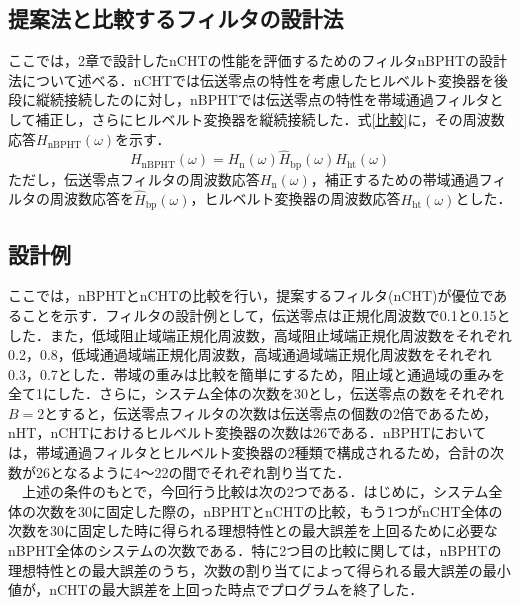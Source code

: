 \documentclass[technicalreport]{ieicej}
\begin{document}
\subsection{提案法と比較するフィルタの設計法}
ここでは，2章で設計したnCHTの性能を評価するためのフィルタnBPHTの設計法について述べる．nCHTでは伝送零点の特性を考慮したヒルベルト変換器を後段に縦続接続したのに対し，nBPHTでは伝送零点の特性を帯域通過フィルタとして補正し，さらにヒルベルト変換器を縦続接続した．式\eqref{比較}に，その周波数応答$H_{\mathrm{nBPHT}}(\omega)$を示す．\begin{equation}\label{比較}
H_{\mathrm{nBPHT}}(\omega)=H_{\mathrm{n}}(\omega)\hat{H}_{\mathrm{bp}}(\omega)H_{\mathrm{ht}}(\omega)
\end{equation}
ただし，伝送零点フィルタの周波数応答$H_{\mathrm{n}}(\omega)$，補正するための帯域通過フィルタの周波数応答を$\hat{H}_{\mathrm{bp}}(\omega)$，ヒルベルト変換器の周波数応答$H_{\mathrm{ht}}(\omega)$とした．

\subsection{設計例}
ここでは，nBPHTとnCHTの比較を行い，提案するフィルタ(nCHT)が優位であることを示す．フィルタの設計例として，伝送零点は正規化周波数で0.1と0.15とした．また，低域阻止域端正規化周波数，高域阻止域端正規化周波数をそれぞれ0.2，0.8，低域通過域端正規化周波数，高域通過域端正規化周波数をそれぞれ0.3，0.7とした．帯域の重みは比較を簡単にするため，阻止域と通過域の重みを全て1にした．さらに，システム全体の次数を30とし，伝送零点の数をそれぞれ$B=2$とすると，伝送零点フィルタの次数は伝送零点の個数の2倍であるため，nHT，nCHTにおけるヒルベルト変換器の次数は26である．nBPHTにおいては，帯域通過フィルタとヒルベルト変換器の2種類で構成されるため，合計の次数が26となるように4〜22の間でそれぞれ割り当てた．\\
　上述の条件のもとで，今回行う比較は次の2つである．はじめに，システム全体の次数を30に固定した際の，nBPHTとnCHTの比較，もう1つがnCHT全体の次数を30に固定した時に得られる理想特性との最大誤差を上回るために必要なnBPHT全体のシステムの次数である．特に2つ目の比較に関しては，nBPHTの理想特性との最大誤差のうち，次数の割り当てによって得られる最大誤差の最小値が，nCHTの最大誤差を上回った時点でプログラムを終了した．
\end{document}
